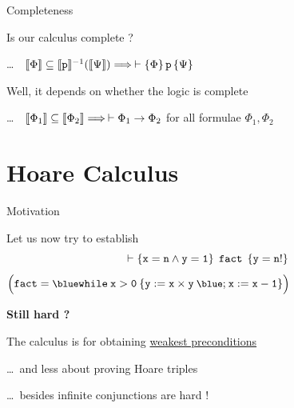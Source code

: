 \documentclass{beamer}
\begin{document}
\begin{frame}{Completeness}

        Is our calculus complete ?

        \dots \, \ie\  $\llbracket \Phi \rrbracket \subseteq \llbracket \mathtt{p} \rrbracket^{-1}(\llbracket \Psi \rrbracket) \Longrightarrow
        \> 
        \vdash \{ \Phi \} \, \mathtt{p} \, \{ \Psi \}$

        \pause
        \bigskip
        Well, it depends on whether the logic is complete

        \dots \, \ie\ $\llbracket \Phi_1 \rrbracket \subseteq \llbracket \Phi_2 \rrbracket \Longrightarrow \> \vdash \Phi_1 \rightarrow \Phi_2$
        for all formulae $\Phi_1, \Phi_2$

\end{frame}

\section{Hoare Calculus}

\begin{frame}{Motivation}

        Let us now try to establish
        \[
                \vdash \{ \mathtt{x =n \wedge y = 1} \} \> \> \mathtt{fact} \> \>
                \{ \mathtt{y = n!} \}
        \]
        ${\small \Big ( \prog{fact} = \prog{{\blue while} \> x > 0 \> \{ y :=
        x \times y \> {\blue ;} \> x := x - 1 \} } \Big )}$

        \pause
        \bigskip
        \bigskip
        \textbf{Still hard ? }

        The calculus is for obtaining \alert{\underline{weakest preconditions}}

        \dots \, and less about proving Hoare triples

        \dots \, besides infinite conjunctions are hard !
\end{frame}
\end{document}

